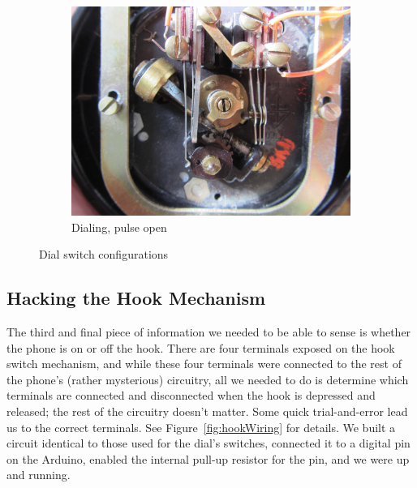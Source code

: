 \documentclass{es50report}
\begin{document}
\begin{figure}
        \begin{subfigure}[b]{0.47\textwidth}
                \includegraphics[width=\textwidth, clip=true, trim=300 250 300 70]{images/small/dialPulse}
                \caption{Dialing, pulse open}
                \label{fig:dialPulse}
        \end{subfigure}
        \caption{Dial switch configurations}\label{fig:dialState}
    \end{figure}

    \subsection{Hacking the Hook Mechanism}
    The third and final piece of information we needed to be able to sense is whether the phone is on or off the hook. There are four terminals exposed on the hook switch mechanism, and while these four terminals were connected to the rest of the phone's (rather mysterious) circuitry, all we needed to do is determine which terminals are connected and disconnected when the hook is depressed and released; the rest of the circuitry doesn't matter. Some quick trial-and-error lead us to the correct terminals. See Figure~\ref{fig:hookWiring} for details. We built a circuit identical to those used for the dial's switches, connected it to a digital pin on the Arduino, enabled the internal pull-up resistor for the pin, and we were up and running.
\end{document}
